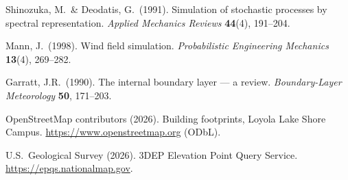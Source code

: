 \documentclass[11pt,letterpaper]{article}
\begin{document}
\begin{description}[font=\normalfont\itshape,leftmargin=1em]
  \item Shinozuka, M.\ \& Deodatis, G.\ (1991). Simulation of stochastic processes by spectral representation. \emph{Applied Mechanics Reviews} \textbf{44}(4), 191--204.
  \item Mann, J.\ (1998). Wind field simulation. \emph{Probabilistic Engineering Mechanics} \textbf{13}(4), 269--282.
  \item Garratt, J.R.\ (1990). The internal boundary layer --- a review. \emph{Boundary-Layer Meteorology} \textbf{50}, 171--203.
  \item OpenStreetMap contributors (2026). Building footprints, Loyola Lake Shore Campus. \url{https://www.openstreetmap.org} (ODbL).
  \item U.S.\ Geological Survey (2026). 3DEP Elevation Point Query Service. \url{https://epqs.nationalmap.gov}.
\end{description}
\end{document}
